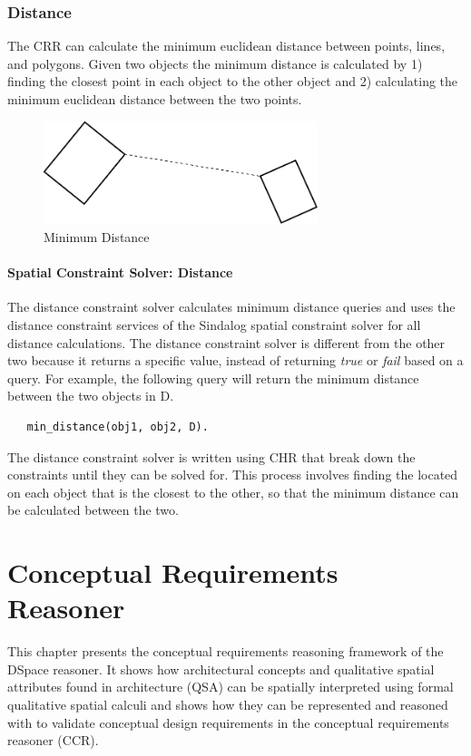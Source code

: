 \documentclass[12pt]{ucthesis}
\begin{document}
\subsection{Distance}
The CRR can calculate the minimum euclidean distance between points, lines, and polygons. Given two objects the minimum distance is calculated by 1) finding the closest point in each object to the other object and 2) calculating the minimum euclidean distance between the two points. 

\begin{figure}[H]
\centering
\includegraphics[width=80mm]{min-dist}
\caption{Minimum Distance}
\label{min-dist}
\end{figure}

\subsubsection{Spatial Constraint Solver: Distance}
The distance constraint solver calculates minimum distance queries and uses the distance constraint services of the Sindalog \cite{sindalog} spatial constraint solver for all distance calculations. The distance constraint solver is different from the other two because it returns a specific value, instead of returning \emph{true} or \emph{fail} based on a query. For example, the following query will return the minimum distance between the two objects in D.
\begin{verbatim}
   min_distance(obj1, obj2, D). 
\end{verbatim}

The distance constraint solver is written using CHR that break down the constraints until they can be solved for. This process involves finding the located on each object that is the closest to the other, so that the minimum distance can be calculated between the two. 


\chapter{Conceptual Requirements Reasoner}
This chapter presents the conceptual requirements reasoning framework of the DSpace reasoner. It shows how architectural concepts and qualitative spatial attributes found in architecture (QSA) can be spatially interpreted using formal qualitative spatial calculi and shows how they can be represented and reasoned with to validate conceptual design requirements in the conceptual requirements reasoner (CCR). 
\end{document}
